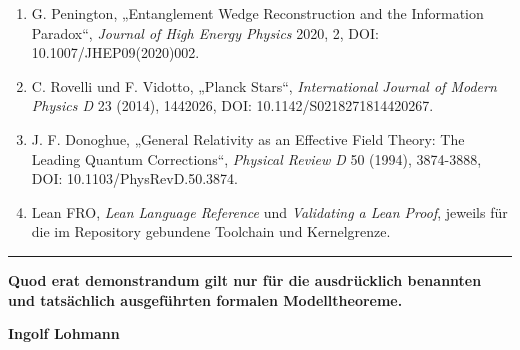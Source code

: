 \documentclass[
  11pt,
  a4paper,
]{article}
\begin{document}
\begin{enumerate}
{  Physics} 2013, 62, DOI: 10.1007/JHEP02(2013)062.
\item
  G. Penington, „Entanglement Wedge Reconstruction and the Information
  Paradox``, \emph{Journal of High Energy Physics} 2020, 2, DOI:
  10.1007/JHEP09(2020)002.
\item
  C. Rovelli und F. Vidotto, „Planck Stars``, \emph{International
  Journal of Modern Physics D} 23 (2014), 1442026, DOI:
  10.1142/S0218271814420267.
\item
  J. F. Donoghue, „General Relativity as an Effective Field Theory: The
  Leading Quantum Corrections``, \emph{Physical Review D} 50 (1994),
  3874-3888, DOI: 10.1103/PhysRevD.50.3874.
\item
  Lean FRO, \emph{Lean Language Reference} und \emph{Validating a Lean
  Proof}, jeweils für die im Repository gebundene Toolchain und
  Kernelgrenze.
\end{enumerate}

\begin{center}\rule{0.5\linewidth}{0.5pt}\end{center}

\textbf{Quod erat demonstrandum gilt nur für die ausdrücklich benannten
und tatsächlich ausgeführten formalen Modelltheoreme.}

\textbf{Ingolf Lohmann}
\end{document}
